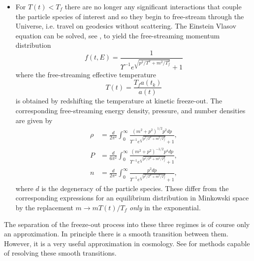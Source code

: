\documentclass[Universe,article,submit,moreauthors,pdftex]{Definitions/mdpi}
\begin{document}
\begin{itemize}
\item
For $T(t)<T_f$ there are no longer any significant interactions that couple the particle species of interest and so they begin to free-stream through the Universe, i.e. travel on geodesics without scattering.  The Einstein Vlasov equation can be solved, see \cite{Choquet-Bruhat:2009xil}, to yield the free-streaming momentum distribution
\begin{equation}\label{free_stream_dist}
f(t,E)=\frac{1}{\Upsilon^{-1}e^{\sqrt{p^2/T^2+m^2 /T_f^2}}+ 1}
\end{equation}
where the free-streaming effective temperature
\begin{equation}\label{T_freestream_dist}
T(t)=\frac{T_fa(t_k)}{a(t)}
\end{equation}
is obtained by redshifting the temperature at kinetic freeze-out. The corresponding free-streaming energy density, pressure, and number densities are given by
\begin{align}
\rho&=\frac{d}{2\pi^2}\!\int_0^\infty\!\!\!\frac{\left(m^2+p^2\right)^{1/2}p^2dp }{\Upsilon^{-1}e^{\sqrt{p^2/T^2+m^2/T_f^2}}+ 1},\label{freestream_rho}\\[0.2cm]
P&=\frac{d}{6\pi^2}\!\int_0^\infty\!\!\!\frac{\left(m^2+p^2\right)^{-1/2}p^4dp }{\Upsilon^{-1} e^{\sqrt{p^2/T^2+m^2/T_f^2}}+ 1},\label{freestream_P}\\[0.2cm]
n&=\frac{d}{2\pi^2}\!\int_0^\infty\!\!\!\frac{p^2dp }{\Upsilon^{-1}e^{\sqrt{p^2/T^2+m^2/T_f^2}}+ 1},
\label{num_density}
\end{align}
where $d$ is the degeneracy of the particle species. These differ from the corresponding expressions for an equilibrium distribution in Minkowski space by the replacement $m\rightarrow m T(t)/T_f$  {\em only} in the exponential. 
\end{itemize}
The separation of the freeze-out process into these three regimes is of course only an approximation.  In principle there is a smooth transition between them.  However, it is a very useful approximation in cosmology.  See \cite{Mangano:2005cc,Birrell:2014gea} for methods capable of resolving these smooth transitions.
\end{document}
